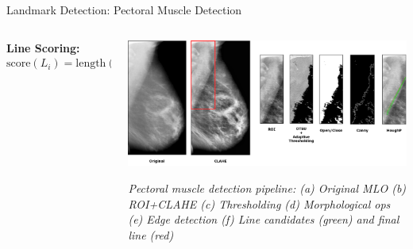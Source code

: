 \documentclass[8pt,aspectratio=169,xcolor=dvipsnames]{beamer}
\begin{document}
\begin{frame}{Landmark Detection: Pectoral Muscle Detection}
\begin{columns}
\begin{column}{0.53\textwidth}
            \textbf{Line Scoring:}
            \begin{equation}
            \text{score}(L_i) = \text{length}(L_i) \cdot (w_{pos} \cdot \text{pos\_score} + w_{angle} \cdot \text{angle\_score})
            \end{equation}
        \end{column}
        
        \begin{column}{0.47\textwidth}
            \centering
            \includegraphics[width=\textwidth]{pectoral.png}
            
            \tiny
            \textit{Pectoral muscle detection pipeline: (a) Original MLO (b) ROI+CLAHE (c) Thresholding (d) Morphological ops (e) Edge detection (f) Line candidates (green) and final line (red)}
        \end{column}
    \end{columns}
    
\end{frame}
\end{document}
